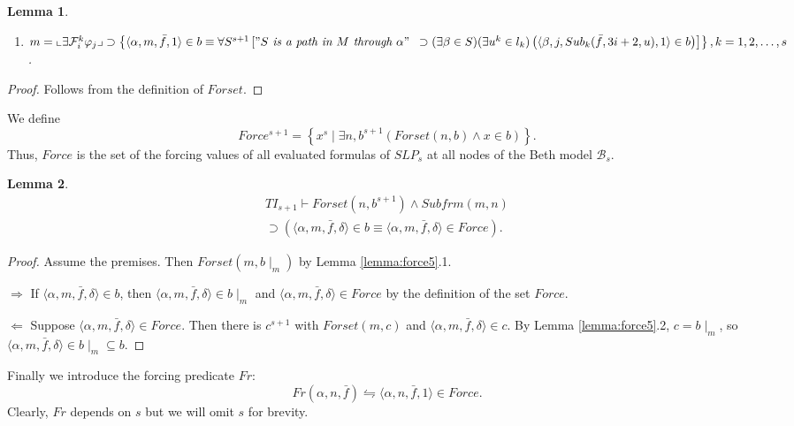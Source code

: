 \documentclass{asl}
\newtheorem{lemma}{Lemma}[section]
\theoremstyle{definition}
\begin{document}
\begin{lemma}
\begin{enumerate}
\item $m=\llcorner\exists \mathcal{F}_i^k \varphi_j\lrcorner 
\supset \left\lbrace \langle\alpha, m,\bar{f},1\rangle \in b \equiv 
\forall S^{s+1}\left["S\textit{ is a path in }M\textit{ through }\alpha" 
\right.
\right.
\smallskip
\\
\left.
\left.
\supset(\exists\beta\in S)(\exists u^k\in l_k)\left(\langle\beta,j,Sub_k(\bar{f},3i+2,u),1\rangle \in b \right)\right] \right\rbrace,k=1,2,\ldots,s$.
\end{enumerate}
\label{lemma:force6}
\end{lemma}
\begin{proof}
Follows from the definition of $Forset$.
\end{proof}

We define
\[Force^{s+1}=\left\lbrace x^s\mid \exists n,b^{s+1}(Forset(n,b)\wedge x\in b)\right\rbrace. \]
Thus, $Force$ is the set of the forcing values of all evaluated formulas of $SLP_s$ at all nodes of the Beth model $\mathcal{B}_s$.

\begin{lemma}
\begin{multline*}
TI_{s+1}\vdash Forset(n,b^{s+1})\wedge Subfrm(m,n)
\\
\supset\left(\langle\alpha, m,\bar{f},\delta\rangle\in b\equiv \langle \alpha,m,\bar{f},\delta\rangle\in Force\right).
\end{multline*}
\label{lemma:force7}
\end{lemma}
\begin{proof}
Assume the premises. Then $Forset(m,b\mid_m)$ by Lemma \ref{lemma:force5}.1.

$\Rightarrow$ If $\langle\alpha, m,\bar{f},\delta\rangle\in b$, then $\langle\alpha, m,\bar{f},\delta\rangle\in b\mid_m$ and $\langle\alpha, m,\bar{f},\delta\rangle\in Force$ by the definition of the set $Force$.

$\Leftarrow$ Suppose $\langle\alpha, m,\bar{f},\delta\rangle\in Force$. Then there is $c^{s+1}$ with 
$Forset(m,c)$ and $\langle\alpha, m,\bar{f},\delta\rangle\in c$. By Lemma \ref{lemma:force5}.2, $c=b\mid_m$, so $\langle\alpha, m,\bar{f},\delta\rangle\in b\mid_m\subseteq b$.
\end{proof}

Finally we introduce the forcing predicate $Fr$: \[Fr(\alpha,n,\bar{f})\leftrightharpoons \langle\alpha,n,\bar{f},1\rangle\in Force.\]
Clearly, $Fr$ depends on $s$ but we will omit $s$ for brevity.
\end{document}
